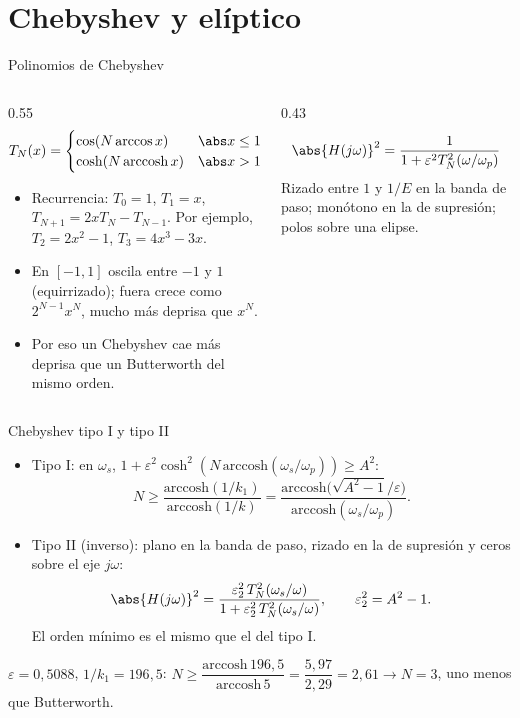 \documentclass[aspectratio=169,11pt]{beamer}
\begin{document}
\section{Chebyshev y elíptico}

\begin{frame}{Polinomios de Chebyshev}
  \begin{columns}[c]
    \begin{column}{0.55\textwidth}
      \[
        T_N(x)=\begin{cases}\cos(N\arccos x) & \abs x\le1\\ \cosh(N\,\mathrm{arccosh}\,x) & \abs x>1\end{cases}
      \]
      \begin{itemize}\small
        \item Recurrencia: $T_0=1$, $T_1=x$, $T_{N+1}=2xT_N-T_{N-1}$. Por ejemplo, $T_2=2x^2-1$, $T_3=4x^3-3x$.
        \item En $[-1,1]$ oscila entre $-1$ y $1$ (equirrizado); fuera crece como $2^{N-1}x^N$, mucho más deprisa que $x^N$.
        \item Por eso un Chebyshev cae más deprisa que un Butterworth del mismo orden.
      \end{itemize}
    \end{column}
    \begin{column}{0.43\textwidth}
      \begin{importante}
        \[
          \abs{H(j\omega)}^2=\frac{1}{1+\varepsilon^2T_N^2(\omega/\omega_p)}
        \]
        \small Rizado entre $1$ y $1/E$ en la banda de paso; monótono en la de supresión; polos sobre una elipse.
      \end{importante}
    \end{column}
  \end{columns}
\end{frame}

\begin{frame}{Chebyshev tipo I y tipo II}
  \small
  \begin{itemize}
    \item \alert{Tipo I}: en $\omega_s$, $1+\varepsilon^2\cosh^2(N\,\mathrm{arccosh}(\omega_s/\omega_p))\ge A^2$:
    \[
      N\ge\frac{\mathrm{arccosh}(1/k_1)}{\mathrm{arccosh}(1/k)}=\frac{\mathrm{arccosh}\big(\sqrt{A^2-1}/\varepsilon\big)}{\mathrm{arccosh}(\omega_s/\omega_p)}.
    \]
    \item \alert{Tipo II} (inverso): plano en la banda de paso, rizado en la de supresión y ceros sobre el eje $j\omega$:
    \[
      \abs{H(j\omega)}^2=\frac{\varepsilon_2^2\,T_N^2(\omega_s/\omega)}{1+\varepsilon_2^2\,T_N^2(\omega_s/\omega)},\qquad\varepsilon_2^2=A^2-1.
    \]
    El orden mínimo es el mismo que el del tipo I.
  \end{itemize}
  \begin{ejemplo}
    $\varepsilon=0{,}5088$, $1/k_1=196{,}5$: $N\ge\dfrac{\mathrm{arccosh}\,196{,}5}{\mathrm{arccosh}\,5}=\dfrac{5{,}97}{2{,}29}=2{,}61\to N=3$, uno menos que Butterworth.
  \end{ejemplo}
\end{frame}
\end{document}
